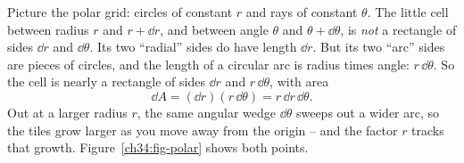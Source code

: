 \begin{happeningbox}
Picture the polar grid: circles of constant $r$ and rays of constant $\theta$.
The little cell between radius $r$ and $r+\dd r$, and between angle $\theta$ and
$\theta+\dd\theta$, is \emph{not} a rectangle of sides $\dd r$ and $\dd\theta$.
Its two ``radial'' sides do have length $\dd r$. But its two ``arc'' sides are
pieces of circles, and the length of a circular arc is radius times angle:
$r\,\dd\theta$. So the cell is nearly a rectangle of sides $\dd r$ and
$r\,\dd\theta$, with area
\[
  \dd A=(\dd r)(r\,\dd\theta)=r\,\dd r\,\dd\theta .
\]
Out at a larger radius $r$, the same angular wedge $\dd\theta$ sweeps out a wider
arc, so the tiles grow larger as you move away from the origin -- and the factor
$r$ tracks that growth. Figure~\ref{ch34:fig-polar} shows both points.
\end{happeningbox}

